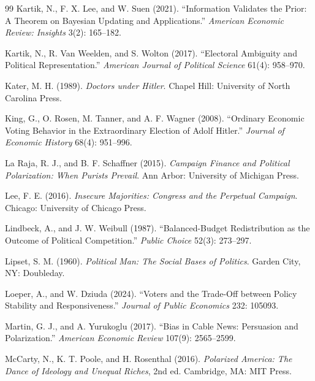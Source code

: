 \documentclass[12pt,letterpaper]{article}
\begin{document}
\begin{thebibliography}{99}
Kartik, N., F. X. Lee, and W. Suen (2021). ``Information Validates the Prior: A Theorem on Bayesian Updating and Applications.'' \textit{American Economic Review: Insights} 3(2): 165--182.

Kartik, N., R. Van Weelden, and S. Wolton (2017). ``Electoral Ambiguity and Political Representation.'' \textit{American Journal of Political Science} 61(4): 958--970.

Kater, M. H. (1989). \textit{Doctors under Hitler}. Chapel Hill: University of North Carolina Press.

King, G., O. Rosen, M. Tanner, and A. F. Wagner (2008). ``Ordinary Economic Voting Behavior in the Extraordinary Election of Adolf Hitler.'' \textit{Journal of Economic History} 68(4): 951--996.

La Raja, R. J., and B. F. Schaffner (2015). \textit{Campaign Finance and Political Polarization: When Purists Prevail}. Ann Arbor: University of Michigan Press.

Lee, F. E. (2016). \textit{Insecure Majorities: Congress and the Perpetual Campaign}. Chicago: University of Chicago Press.

Lindbeck, A., and J. W. Weibull (1987). ``Balanced-Budget Redistribution as the Outcome of Political Competition.'' \textit{Public Choice} 52(3): 273--297.

Lipset, S. M. (1960). \textit{Political Man: The Social Bases of Politics}. Garden City, NY: Doubleday.

Loeper, A., and W. Dziuda (2024). ``Voters and the Trade-Off between Policy Stability and Responsiveness.'' \textit{Journal of Public Economics} 232: 105093.

Martin, G. J., and A. Yurukoglu (2017). ``Bias in Cable News: Persuasion and Polarization.'' \textit{American Economic Review} 107(9): 2565--2599.

McCarty, N., K. T. Poole, and H. Rosenthal (2016). \textit{Polarized America: The Dance of Ideology and Unequal Riches}, 2nd ed. Cambridge, MA: MIT Press.


\end{thebibliography}
\end{document}
